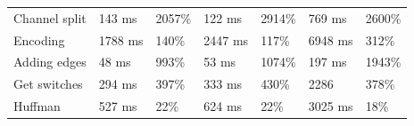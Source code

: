 \begin{table}[H]
\begin{tabular}{@{}lllllll@{}}
        Channel split           & 143 ms                                                                                    & 2057\%                                                                         & 122 ms                                                                                     & 2914\%                                                                        & 769 ms                                                                                  & 2600\%                                                                        \\
        Encoding                & 1788 ms                                                                                   & 140\%                                                                          & 2447 ms                                                                                    & 117\%                                                                         & 6948 ms                                                                                 & 312\%                                                                         \\
        Adding edges            & 48 ms                                                                                     & 993\%                                                                          & 53 ms                                                                                      & 1074\%                                                                        & 197 ms                                                                                  & 1943\%                                                                        \\
        Get switches            & 294 ms                                                                                    & 397\%                                                                          & 333 ms                                                                                     & 430\%                                                                         & 2286                                                                                    & 378\%                                                                         \\
        Huffman                 & 527 ms                                                                                    & 22\%                                                                           & 624 ms                                                                                     & 22\%                                                                          & 3025 ms                                                                                 & 18\%                                                                          \\ \midrule

\end{tabular}
\end{table}
